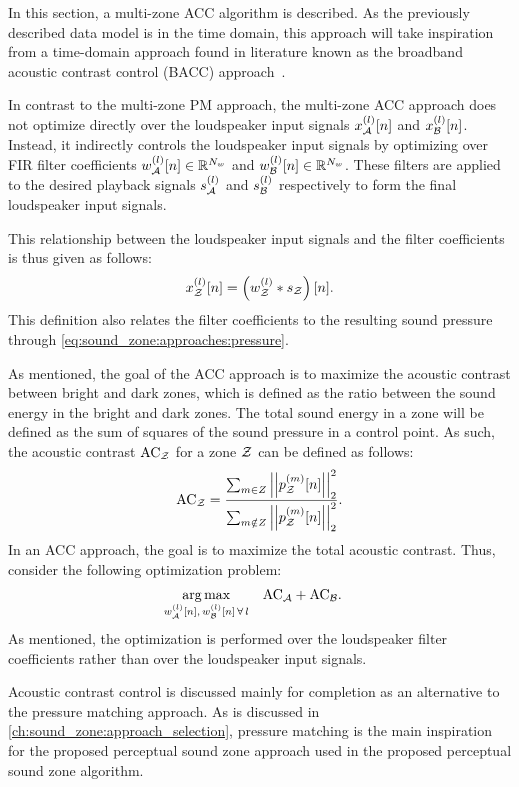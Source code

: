 In this section, a multi-zone ACC algorithm is described.
As the previously described data model is in the time domain, this approach will take inspiration from a time-domain approach found in literature known as the
broadband acoustic contrast control (BACC) approach~\cite{elliott2011regularisation, cai2014time, moller2016sound}.

In contrast to the multi-zone PM approach, the multi-zone ACC approach does not optimize directly over 
the loudspeaker input signals $x_{\mathcal{A}}^{(l)}[n]$ and $x_{\mathcal{B}}^{(l)}[n]$.
Instead, it indirectly controls the loudspeaker input signals by optimizing over 
FIR filter coefficients $w_{\mathcal{A}}^{(l)}[n]\in\mathbb{R}^{N_w}$ and $w_{\mathcal{B}}^{(l)}[n]\in\mathbb{R}^{N_w}$.
These filters are applied to the desired playback signals $s_{\mathcal{A}}^{(l)}$ and $s_{\mathcal{B}}^{(l)}$ 
respectively to form the final loudspeaker input signals.

This relationship between the loudspeaker input signals and the filter coefficients is thus given as follows:
\begin{equation}
    x_{\mathcal{Z}}^{(l)}[n] = \left(w_{\mathcal{Z}}^{(l)} \ast s_{\mathcal{Z}}\right)[n].
\end{equation}
This definition also relates the filter coefficients to the resulting sound pressure 
through \autoref{eq:sound_zone:approaches:pressure}.

As mentioned, the goal of the ACC approach is to maximize the acoustic contrast between bright and dark zones,
which is defined as the ratio between the sound energy in the bright and dark zones.
The total sound energy in a zone will be defined as the sum of squares of the sound pressure in a control point.
As such, the acoustic contrast $\text{AC}_{\mathcal{Z}}$ for a zone $\mathcal{Z}$ can be defined as follows: 
\begin{equation}
    \text{AC}_{\zz} = \frac{\sum_{m\in Z} \norm[2][2]{p_\zz^{(m)}[n]}}{\sum_{m\notin Z} \norm[2][2]{p_\zz^{(m)}[n]}}.
\end{equation}
In an ACC approach, the goal is to maximize the total acoustic contrast.
Thus, consider the following optimization problem:
\begin{align}
    \operatorname*{arg\,max}_{w_{\mathcal{A}}^{(l)}[n],\,w_{\mathcal{B}}^{(l)}[n]\,\forall\,l}\quad 
       &\text{AC}_{\mathcal{A}} + \text{AC}_{\mathcal{B}}
   .
\end{align}
As mentioned, the optimization is performed over the loudspeaker filter coefficients rather than over the loudspeaker input signals.

Acoustic contrast control is discussed mainly for completion as an alternative to the pressure matching approach.
As is discussed in \autoref{ch:sound_zone:approach_selection}, 
pressure matching is the main inspiration for the proposed perceptual sound zone approach used in the proposed perceptual sound zone algorithm.
